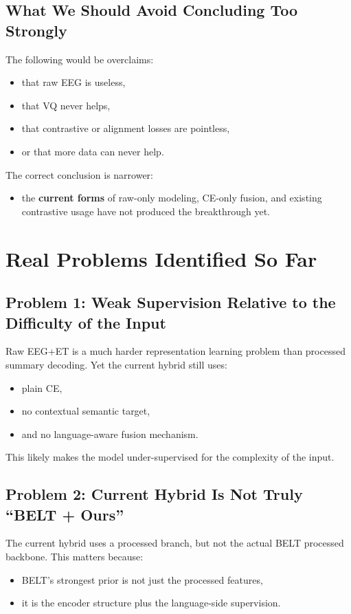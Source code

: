 \documentclass[11pt]{article}
\begin{document}
\subsection{What We Should Avoid Concluding Too Strongly}

The following would be overclaims:
\begin{itemize}
    \item that raw EEG is useless,
    \item that VQ never helps,
    \item that contrastive or alignment losses are pointless,
    \item or that more data can never help.
\end{itemize}

The correct conclusion is narrower:
\begin{itemize}
    \item the \textbf{current forms} of raw-only modeling, CE-only fusion, and existing contrastive usage have not produced the breakthrough yet.
\end{itemize}

\section{Real Problems Identified So Far}

\subsection{Problem 1: Weak Supervision Relative to the Difficulty of the Input}

Raw EEG+ET is a much harder representation learning problem than processed summary decoding. Yet the current hybrid still uses:
\begin{itemize}
    \item plain CE,
    \item no contextual semantic target,
    \item and no language-aware fusion mechanism.
\end{itemize}

This likely makes the model under-supervised for the complexity of the input.

\subsection{Problem 2: Current Hybrid Is Not Truly ``BELT + Ours''}

The current hybrid uses a processed branch, but not the actual BELT processed backbone. This matters because:
\begin{itemize}
    \item BELT's strongest prior is not just the processed features,
    \item it is the encoder structure plus the language-side supervision.
\end{itemize}
\end{document}
